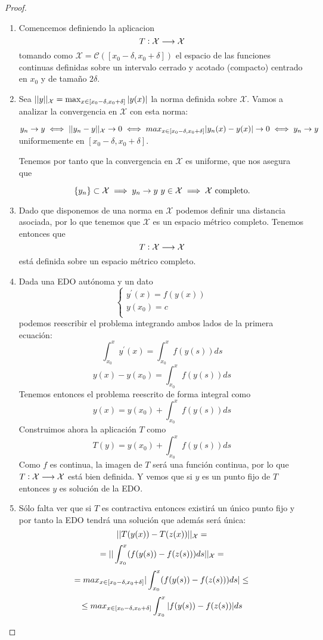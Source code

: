 \begin{proof}
\begin{enumerate}
\item Comencemos definiendo la aplicacion $$T: \mathcal{X} \longrightarrow \mathcal{X}$$ tomando como $\mathcal{X} = \mathcal{C}([x_0-\delta, x_0+\delta])$ el espacio de las funciones continuas definidas sobre un intervalo cerrado y acotado (compacto) centrado en $x_0$ y de tamaño $2\delta$.

\item Sea $||y||_\mathcal{X} = \max_{x\in [x_0-\delta, x_0+\delta]} |y(x)|$ la norma definida sobre $\mathcal{X}$.
Vamos a analizar la convergencia en $\mathcal{X}$ con esta norma:

$y_n\to y \iff ||y_n-y||_\mathcal{X}\to 0 \iff max_{x\in [x_0-\delta, x_0+\delta]} |y_n(x)-y(x)|\to 0 \iff y_n\to y$ uniformemente en $[x_0-\delta, x_0+\delta]$.

Tenemos por tanto que la convergencia en $\mathcal{X}$ es uniforme, que nos asegura que 

$$\{ y_n \}\subset \mathcal{X}\implies y_n\to y\ y\in \mathcal{X} \implies \mathcal{X}\text{ completo.}$$

\item Dado que disponemos de una norma en $\mathcal{X}$ podemos definir una distancia asociada, por lo que tenemos que $\mathcal{X}$ es un espacio métrico completo. Tenemos entonces que $$T: \mathcal{X} \longrightarrow \mathcal{X}$$ está definida sobre un espacio métrico completo.

\item Dada una EDO autónoma y un dato 
$$
\left\lbrace
  \begin{array}{l}
     y^\prime(x) = f(y(x)) \\
     y(x_0) = c  \\
  \end{array}
  \right.
$$
podemos reescribir el problema integrando ambos lados de la primera ecuación:
$$\int_{x_0}^x y^\prime(x) = \int_{x_0}^x f(y(s))ds$$
$$ y(x) - y(x_0) = \int_{x_0}^x f(y(s))ds$$
Tenemos entonces el problema reescrito de forma integral como 
$$ y(x) = y(x_0) + \int_{x_0}^x f(y(s))ds$$
Construimos ahora la aplicación $T$ como
$$ T(y) = y(x_0) + \int_{x_0}^x f(y(s))ds$$
Como $f$ es continua, la imagen de $T$ será una función continua, por lo que $T: \mathcal{X} \longrightarrow \mathcal{X}$ está bien definida. Y vemos que si $y$ es un punto fijo de $T$ entonces $y$ es solución de la EDO.

\item Sólo falta ver que si $T$ es contractiva entonces existirá un único punto fijo y por tanto la EDO tendrá una solución que además será única:
$$||T(y(x)) - T(z(x))||_\mathcal{X} = $$
$$= ||\int_{x_0}^x (f(y(s)) - f(z(s)))ds||_\mathcal{X} = $$
$$= max_{x\in [x_0-\delta, x_0+\delta]} |\int_{x_0}^x (f(y(s)) - f(z(s)))ds| \leq $$
$$\leq max_{x\in [x_0-\delta, x_0+\delta]} \int_{x_0}^x |f(y(s)) - f(z(s))|ds$$


\end{enumerate}
\end{proof}
